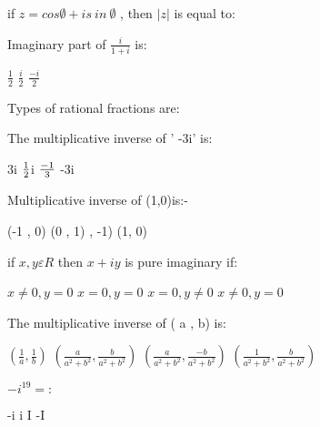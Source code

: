\documentclass{exam}
\begin{document}
\begin{questions}
if \(z = cos\emptyset + is\ in\ \emptyset\) , then \(\left| z \right| \) is equal to:\\
\begin{oneparchoices}
\end{oneparchoices}
\question 

Imaginary part of \(\frac{i}{1+i}\) is:\\
\begin{oneparchoices}
\choice \(\frac{1}{2}\)
\choice \(\frac{i}{2}\)
\choice \(\frac{-i}{2}\)
\end{oneparchoices}
\question 

Types of rational fractions are:\\
\begin{oneparchoices}
\end{oneparchoices}
\question 

The multiplicative inverse of ' -3i' is:\\
\begin{oneparchoices}
\choice 3i
\choice \(1\over2\)i
\choice \(-1\over3\)
\choice -3i
\end{oneparchoices}
\question 

Multiplicative inverse of (1,0)is:-\\
\begin{oneparchoices}
\choice (-1 , 0)
\choice (0 , 1)
 , -1)
\choice (1, 0)
\end{oneparchoices}
\question 

if \(x ,y \varepsilon R\) then \(x + i y\) is pure imaginary if:\\
\begin{oneparchoices}
\choice \(x \neq  0 , y = 0\)
\choice \(x = 0 , y = 0\)
\choice \(x = 0 , y \neq  0\)
\choice \(x \neq  0 , y = 0\)
\end{oneparchoices}
\question 

The multiplicative inverse of ( a , b) is:\\
\begin{oneparchoices}
\choice \((\frac{1}{a} ,\frac{1}{b})\)
\choice \((\frac{a}{a^{2}+b^{2}} ,\frac{b}{a^{2}+b^{2}})\)
\choice \((\frac{a}{a^{2}+b^{2}} ,\frac{-b}{a^{2}+b^{2}})\)
\choice \((\frac{1}{a^{2}+b^{2}} ,\frac{b}{a^{2}+b^{2}})\)
\end{oneparchoices}
\question 

\( -i ^ {19} =:\)\\
\begin{oneparchoices}
\choice -i
\choice i
\choice I
\choice -I
\end{oneparchoices}
\question 


\end{questions}
\end{document}
